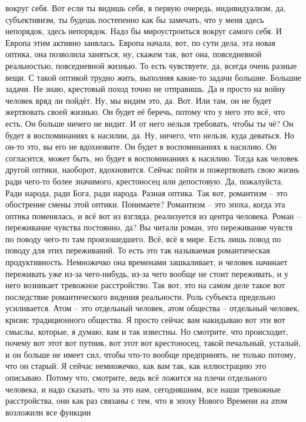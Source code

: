 вокруг себя. Вот если ты видишь себя, в первую очередь, индивидуализм, да,
субъективизм, ты будешь постепенно как бы замечать, что у меня здесь непорядок,
здесь непорядок. Надо бы мироустроиться вокруг самого себя. И Европа этим
активно занялась. Европа начала, вот, по сути дела, эта новая оптика, она
позволила заняться, ну, скажем так, вот она, повседневной реальностью,
повседневной жизнью. То есть чувствуете, да, всегда очень разные вещи. С такой
оптикой трудно жить, выполняя какие-то задачи большие. Большие задачи. Не знаю,
крестовый поход точно не отправишь. Да и просто на войну человек вряд ли пойдёт.
Ну, мы видим это, да. Вот. Или там, он не будет жертвовать своей жизнью. Он
будет её беречь, потому что у него это всё, что есть. Он больше ничего не видит.
И от него нельзя требовать, чтобы ты чё? Он будет в воспоминаниях к насилии, да.
Ну, ничего, что нельзя, куда деваться. Но он-то это, вы его не вдохновите. Он
будет в воспоминаниях к насилию. Он согласится, может быть, но будет в
воспоминаниях к насилию. Тогда как человек другой оптики, наоборот, вдохновится.
Сейчас пойти и пожертвовать свою жизнь ради чего-то более значимого, крестоносец
или депостовую. Да, пожалуйста. Ради народа, ради Бога, ради народа. Разная
оптика. Так вот, романтизм – это обострение смены этой оптики. Понимаете?
Романтизм – это эпоха, когда эта оптика поменялась, и всё вот из взгляда,
реализуется из центра человека. Роман – переживание чувства постоянно, да? Вы
читали роман, это переживание чувств по поводу чего-то там произошедшего. Всё,
всё в мире. Есть лишь повод по поводу для этих переживаний. То есть это так
называемая романтическая продуктивность. Немножечко она временами зашкаливает, и
человек начинает переживать уже из-за чего-нибудь, из-за чего вообще не стоит
переживать, и у него возникает тревожное расстройство. Так вот, это на самом
деле такое вот последствие романтического видения реальности. Роль субъекта
предельно усиливается. Атом – это отдельный человек, атом общества – отдельный
человек, кризис традиционного общества. Я просто сейчас вам накидываю вот эти
вот смыслы, которые, я думаю, вам и так известны. Но смотрите, что происходит,
почему вот этот вот путник, вот этот вот крестоносец, такой печальный, усталый,
и он больше не имеет сил, чтобы что-то вообще предпринять, не только потому, что
он старый. Я сейчас немножечко, как вам так, как иллюстрацию это описываю.
Потому что, смотрите, ведь всё ложится на плечи отдельного человека, и надо
сказать, что за это нам, сегодняшним, все наши тревожные расстройства, они как
раз связаны с тем, что в эпоху Нового Времени на атом возложили все функции
